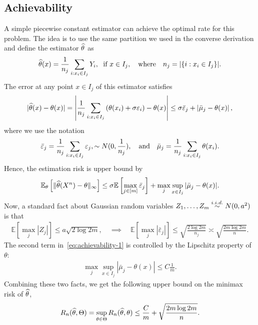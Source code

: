 \documentclass[12pt]{article}
\begin{document}
\subsection{Achievability}
\label{subsec:nonparametric-regression-achievability}
A simple piecewise constant estimator can achieve the optimal rate for this problem. The idea is to use the same partition we used in the converse derivation and define the estimator $\widehat{\theta}$ as 
\begin{align}
\widehat{\theta}(x) = \frac{1}{n_j} \sum_{i:x_i \in I_j} Y_i, \; \text{ if } x \in I_j, \quad \text{where} \quad n_j = |\{i: x_i \in I_j\}|. 
\end{align}
The error at any point $x \in I_j$ of this estimator satisfies 
\begin{align}
|\widehat{\theta}(x) - \theta(x)| = \left\lvert \frac{1}{n_j} \sum_{i: x_i \in I_j}\left( \theta(x_i) + \sigma \varepsilon_i \right) - \theta(x) \right\rvert \leq \sigma \bar{\varepsilon}_j + \left\lvert \bar{\mu}_j - \theta(x) \right\rvert, 
\end{align}
where we use the notation 
\begin{align}
\bar{\varepsilon}_j = \frac{1}{n_j} \sum_{i: x_i \in I_j} \varepsilon_j, \sim N(0, \frac{1}{n_j}), \quad \text{and} \quad 
\bar{\mu}_j =  \frac{1}{n_j}\sum_{i: x_i \in I_j}  \theta(x_i). 
\end{align}
Hence, the estimation risk is upper bound by 
\begin{align}
\mathbb{E}_{\theta}\left[ \|\widehat{\theta}(X^n) - \theta\|_\infty \right] \leq  \sigma \mathbb{E} \left[ \max_{j \in [m]} \bar{\varepsilon}_j \right] + \max_{j} \sup_{x \in I_j} |\bar{\mu}_j - \theta(x)|. \label{eq:achievability-1}
\end{align}
Now, a standard fact about Gaussian random variables $Z_1, \ldots, Z_m \stackrel{i.i.d.}{\sim} N(0, a^2)$ is that 
\begin{align}
	\mathbb{E}[\max_{j} |Z_j|] \leq a \sqrt{2 \log 2m}, \quad \implies \quad  
	\mathbb{E}[\max_j |\bar{\varepsilon}_j|] \leq \sqrt{\frac{2 \log 2m}{n_j}} \asymp \sqrt{\frac{2m \log 2m}{n}}. 
\end{align}
The second term in~\eqref{eq:achievability-1} is controlled by the Lipschitz property of $\theta$: 
\begin{align}
	\max_{j} \sup_{x \in I_j} |\bar{\mu}_j - \theta(x)| \leq C \frac{1}{m}. 
\end{align}
Combining these two facts, we get the following upper bound on the minimax risk of $\widehat{\theta}$, 
\begin{align}
R_n(\widehat{\theta}, \Theta) = \sup_{\theta \in \Theta} R_n(\widehat{\theta}, \theta) \leq \frac{C}{m} + \sqrt{\frac{2m \log 2m}{n}}. 
\end{align}
\end{document}
